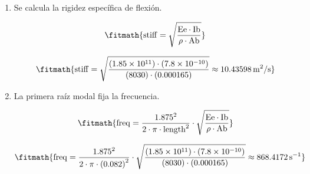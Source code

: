 \begin{enumerate}

\item Se calcula la rigidez específica de flexión.

\[\fitmath{\mathrm{stiff}=\sqrt{\frac{\mathrm{Ee}\cdot \mathrm{Ib}}{\rho\cdot \mathrm{Ab}}}}\]

\[\fitmath{\mathrm{stiff}=\sqrt{\frac{(1.85\times10^{11})\cdot (7.8\times10^{-10})}{(8030)\cdot (0.000165)}}\approx 10.43598\,\mathrm{m^{2}/s}}\]

\item La primera raíz modal fija la frecuencia.

\[\fitmath{\mathrm{freq}=\frac{{1.875}^{2}}{2\cdot \pi\cdot {\mathrm{length}}^{2}}\cdot \sqrt{\frac{\mathrm{Ee}\cdot \mathrm{Ib}}{\rho\cdot \mathrm{Ab}}}}\]

\[\fitmath{\mathrm{freq}=\frac{{1.875}^{2}}{2\cdot \pi\cdot {(0.082)}^{2}}\cdot \sqrt{\frac{(1.85\times10^{11})\cdot (7.8\times10^{-10})}{(8030)\cdot (0.000165)}}\approx 868.4172\,\mathrm{s^{-1}}}\]

\end{enumerate}
